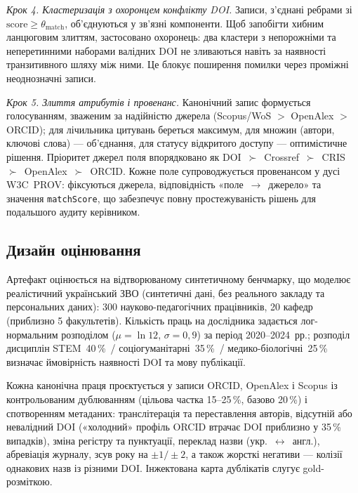 \emph{Крок 4. Кластеризація з охоронцем конфлікту DOI.} Записи, з'єднані ребрами зі $\mathrm{score}\ge\theta_{\text{match}}$, об'єднуються у зв'язні компоненти. Щоб запобігти хибним ланцюговим злиттям, застосовано охоронець: два кластери з непорожніми та неперетинними наборами валідних DOI не зливаються навіть за наявності транзитивного шляху між ними. Це блокує поширення помилки через проміжні неоднозначні записи.

\emph{Крок 5. Злиття атрибутів і провенанс.} Канонічний запис формується голосуванням, зваженим за надійністю джерела (Scopus/WoS $>$ OpenAlex $>$ ORCID); для лічильника цитувань береться максимум, для множин (автори, ключові слова) — об'єднання, для статусу відкритого доступу — оптимістичне рішення. Пріоритет джерел поля впорядковано як DOI~$\succ$~Crossref~$\succ$~CRIS~$\succ$~OpenAlex~$\succ$~ORCID. Кожне поле супроводжується провенансом у дусі W3C~PROV: фіксуються джерела, відповідність «поле~$\rightarrow$~джерело» та значення \texttt{matchScore}, що забезпечує повну простежуваність рішень для подальшого аудиту керівником.

\subsection*{Дизайн оцінювання}

Артефакт оцінюється на відтворюваному синтетичному бенчмарку, що моделює реалістичний український ЗВО (синтетичні дані, без реального закладу та персональних даних): 300 науково-педагогічних працівників, 20 кафедр (приблизно 5 факультетів). Кількість праць на дослідника задається лог-нормальним розподілом ($\mu=\ln 12$, $\sigma=0{,}9$) за період 2020--2024~рр.; розподіл дисциплін STEM~40\,\%~/ соціогуманітарні~35\,\%~/ медико-біологічні~25\,\% визначає ймовірність наявності DOI та мову публікації.

Кожна канонічна праця проєктується у записи ORCID, OpenAlex і Scopus із контрольованим дублюванням (цільова частка 15--25\,\%, базово 20\,\%) і спотворенням метаданих: транслітерація та переставлення авторів, відсутній або невалідний DOI («холодний» профіль ORCID втрачає DOI приблизно у 35\,\% випадків), зміна регістру та пунктуації, переклад назви (укр.~$\leftrightarrow$~англ.), абревіація журналу, зсув року на $\pm 1/\pm 2$, а також жорсткі негативи — колізії однакових назв із різними DOI. Інжектована карта дублікатів слугує gold-розміткою.

